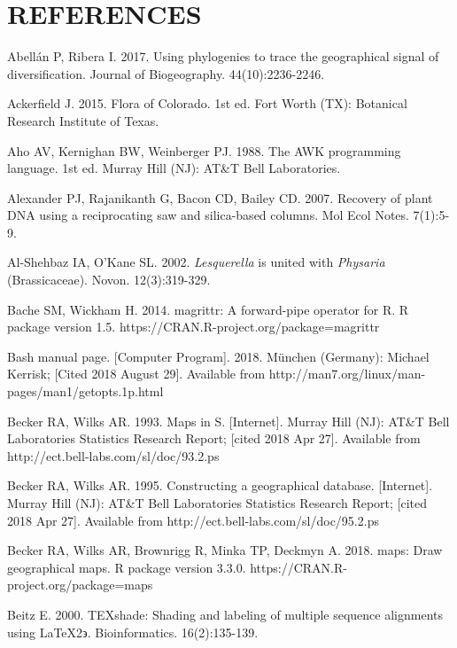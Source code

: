 \chapter*{REFERENCES}
\vspace*{-12pt}

\setlength{\parindent}{-4em}
\setlength{\leftskip}{4em}
\setlength{\parskip}{12pt}
\singlespacing

\hspace*{-4em}Abellán P, Ribera I. 2017. Using phylogenies to trace the geographical signal of diversification. Journal of Biogeography. 44(10):2236-2246.

Ackerfield J. 2015. Flora of Colorado. 1st ed. Fort Worth (TX): Botanical Research Institute of Texas.

Aho AV, Kernighan BW, Weinberger PJ. 1988. The AWK programming language. 1st ed. Murray Hill (NJ): AT\&T Bell Laboratories.

Alexander PJ, Rajanikanth G, Bacon CD, Bailey CD. 2007. Recovery of plant DNA using a reciprocating saw and silica-based columns. Mol Ecol Notes. 7(1):5-9.

Al-Shehbaz IA, O’Kane SL. 2002. \textit{Lesquerella} is united with \textit{Physaria} (Brassicaceae). Novon. 12(3):319-329.

Bache SM, Wickham H. 2014. magrittr: A forward-pipe operator for R. R package version 1.5. https://CRAN.R-project.org/package=magrittr

Bash manual page. [Computer Program]. 2018. München (Germany): Michael Kerrisk; [Cited 2018 August 29].  Available from http://man7.org/linux/man-pages/man1/getopts.1p.html

Becker RA, Wilks AR. 1993. Maps in S. [Internet]. Murray Hill (NJ): AT\&T Bell Laboratories Statistics Research Report; [cited 2018 Apr 27]. Available from http://ect.bell-labs.com/sl/doc/93.2.ps

Becker RA, Wilks AR. 1995. Constructing a geographical database. [Internet]. Murray Hill (NJ): AT\&T Bell Laboratories Statistics Research Report; [cited 2018 Apr 27]. Available from http://ect.bell-labs.com/sl/doc/95.2.ps

Becker RA, Wilks AR, Brownrigg R, Minka TP, Deckmyn A. 2018. maps: Draw geographical maps. R package version 3.3.0. https://CRAN.R-project.org/package=maps

Beitz E. 2000. TEXshade: Shading and labeling of multiple sequence alignments using \LaTeX 2$\backepsilon$. Bioinformatics. 16(2):135-139.

